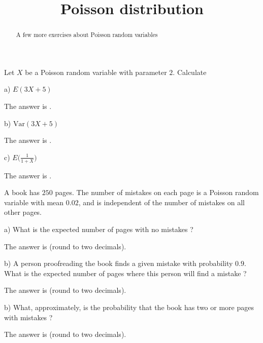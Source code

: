 \documentclass{ximera}
\title{Poisson distribution}
\begin{document}
\begin{abstract}
A few more exercises about Poisson random variables
\end{abstract}
\maketitle

Let $X$ be a Poisson random variable with parameter $2$. Calculate 

\begin{question}
a) $E(3X+5)$
     \begin{solution}
          The answer is .
     \end{solution}
\end{question}

\begin{question}
b) $\text{Var}(3X+5)$
     \begin{solution}
          The answer is .
     \end{solution}
\end{question}

\begin{question}
c) $E\bigg( \frac{1}{1+X} \bigg)$
     \begin{solution}
          The answer is .
     \end{solution}
\end{question}

A book has $250$ pages. The number of mistakes on each page is a Poisson random variable with mean $0.02$, and is independent of the number of mistakes on all other pages.

\begin{question}
a) What is the expected number of pages with no mistakes ?
     \begin{solution}
          The answer is  (round to two decimals).
     \end{solution}
\end{question}

\begin{question}
b) A person proofreading the book finds a given mistake with probability $0.9$. What is the expected number of pages where this person will find a mistake ? 
     \begin{solution}
          The answer is  (round to two decimals).
     \end{solution}
\end{question}

\begin{question}
b) What, approximately, is the probability that the book has two or more pages with mistakes ? 
     \begin{solution}
          The answer is  (round to two decimals).
     \end{solution}
\end{question}
\end{document}
